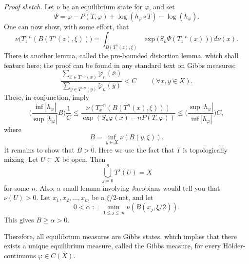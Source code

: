 \documentclass[11pt,a4paper]{article}
\begin{document}
\textit{Proof sketch.}
Let $\nu$ be an equilibrium state for $\varphi$, and set
\[
\Psi=\varphi-P(T,\varphi)+\log(h_\varphi\circ T)-\log(h_\varphi).
\]
One can now show, with some effort, that
\[
\nu\bigl(T_z^{-n}(B(T^n(z),\xi))\bigr)
=\int_{B(T^n(z),\xi)}
\exp\bigl(S_n\Psi(T_z^{-n}(x))\bigr)\,d\nu(x).
\]
There is another lemma, called the pre-bounded distortion lemma, which shall
feature here; the proof can be found in any standard text on Gibbs measures:
\[
\frac{\displaystyle\sum_{\overline x\in T^{-n}(x)}
\widetilde\varphi_n(\overline x)}
{\displaystyle\sum_{\overline y\in T^{-n}(y)}
\widetilde\varphi_n(\overline y)}<C
\qquad(\forall x,y\in X).
\]
These, in conjunction, imply
\[
\Bigg(\frac{\inf |h_\varphi|}{\sup |h_\varphi|}B\Bigg)\frac1C
\leq
\frac{\nu(T_x^{-n}(B(T^n(x),\xi)))}
{\exp(S_n\varphi(x)-nP(T,\varphi))}
\leq
\Bigg(\frac{\sup |h_\varphi|}{\inf |h_\varphi|}\Bigg)C,
\]
where
\[
B=\inf_{y\in X}\nu(B(y,\xi)).
\]
It remains to show that $B>0$. Here we use the fact that $T$ is topologically
mixing. Let $U\subset X$ be open. Then
\[
\bigcup_{j=0}^{n}T^j(U)=X
\]
for some $n$. Also, a small lemma involving Jacobians would tell you that
$\nu(U)>0$. Let $x_1,x_2,\ldots,x_m$ be a $\xi/2$-net, and let
\[
0<\alpha:=\min_{1\leq j\leq m}\nu(B(x_j,\xi/2)).
\]
This gives $B\geq\alpha>0$.

Therefore, all equilibrium measures are Gibbs states, which implies that
there exists a unique equilibrium measure, called the Gibbs measure, for
every H\"older-continuous $\varphi\in C(X)$.

\end{document}
